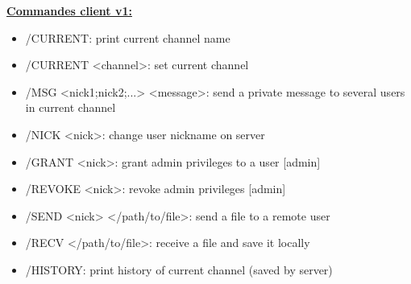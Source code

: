 \documentclass[12pt]{article}
\begin{document}
{\large \textbf{\underline{Commandes client v1:}}}
\begin{itemize}
    \item /CURRENT: print current channel name
\item /CURRENT <channel>: set current channel
\item /MSG <nick1;nick2;...> <message>: send a private message to several users in current channel
\item /NICK <nick>: change user nickname on server
\item /GRANT <nick>: grant admin privileges to a user [admin]
\item /REVOKE <nick>: revoke admin privileges [admin]
\item /SEND <nick> </path/to/file>: send a file to a remote user
\item /RECV </path/to/file>: receive a file and save it locally
\item /HISTORY: print history of current channel (saved by server)
\end{itemize}
\end{document}
